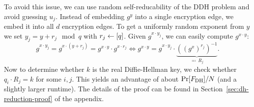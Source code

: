 To avoid this issue, we can use random self-reducability of the DDH problem and avoid guessing $u_j$. Instead of embedding $g^y$ into a single encryption edge, we embed it into all $d$ encryption edges. To get a uniformly random exponent from $y$ we set $y_j = y + r_j \mod q$ with $r_j \leftarrow [q]$. Given $g^{x \cdot y_j}$, we can easily compute $g^{x \cdot y}$:
\[
	g^{x \cdot y_j} = g^{x \cdot (y + r_j)} = g^{x \cdot y}	\cdot g^{x \cdot r_j} \iff g^{x \cdot y} = g^{x \cdot y_j} \cdot \underbrace{((g^x)^{r_j})^{-1}}_{\eqqcolon \, R_j}.
\]
Now to determine whether $k$ is the real Diffie-Hellman key, we check whether $q_i \cdot R_j = k$ for some $i, j$. This yields an advantage of about $\pr{\fdh} / N$ (and a slightly larger runtime). The details of the proof can be found in Section~\ref{sec:dh-reduction-proof} of the appendix.
